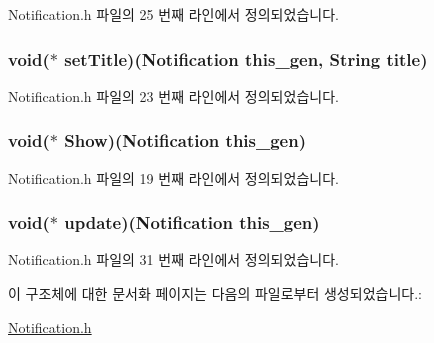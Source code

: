 Notification.\-h 파일의 25 번째 라인에서 정의되었습니다.

\hypertarget{struct___notification_a73a3d4126ff83547c55a74c8d31223bf}{
\subsubsection[{set\-Title}]{\setlength{\rightskip}{0pt plus 5cm}void($\ast$  set\-Title)({\bf Notification} this\-\_\-gen, {\bf String} title)}}\label{struct___notification_a73a3d4126ff83547c55a74c8d31223bf}


Notification.\-h 파일의 23 번째 라인에서 정의되었습니다.

\hypertarget{struct___notification_ab9b2b384b324352b76dbd9630f56fbbd}{
\subsubsection[{Show}]{\setlength{\rightskip}{0pt plus 5cm}void($\ast$  Show)({\bf Notification} this\-\_\-gen)}}\label{struct___notification_ab9b2b384b324352b76dbd9630f56fbbd}


Notification.\-h 파일의 19 번째 라인에서 정의되었습니다.

\hypertarget{struct___notification_a0b608c07f45459f63d0bed2f4f6c5962}{
\subsubsection[{update}]{\setlength{\rightskip}{0pt plus 5cm}void($\ast$  update)({\bf Notification} this\-\_\-gen)}}\label{struct___notification_a0b608c07f45459f63d0bed2f4f6c5962}


Notification.\-h 파일의 31 번째 라인에서 정의되었습니다.



이 구조체에 대한 문서화 페이지는 다음의 파일로부터 생성되었습니다.\-:\begin{DoxyCompactItemize}
\item 
\hyperlink{_notification_8h}{Notification.\-h}\end{DoxyCompactItemize}
